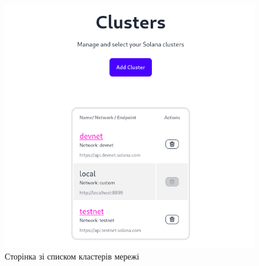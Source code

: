 \documentclass[14pt]{extreport}
\begin{document}
  \begin{figure}[H]
    \centering
    \includegraphics[scale=0.5]{UIClusters}
    \caption{Сторінка зі списком кластерів мережі}
  \end{figure}
  
\end{document}

